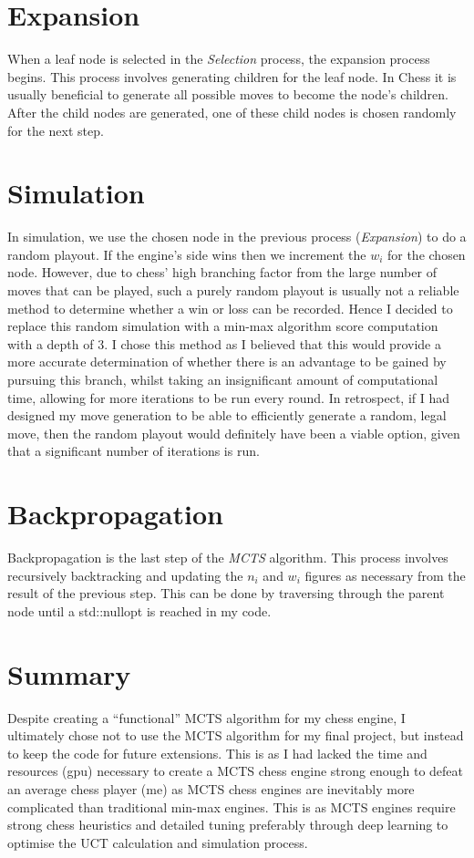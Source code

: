 \section{Expansion}
When a leaf node is selected in the \textit{Selection} process, the expansion process begins. This process involves generating children for the leaf node. In Chess it is usually beneficial to generate all possible moves to become the node's children. After the child nodes are generated, one of these child nodes is chosen randomly for the next step.
\section{Simulation}
In simulation, we use the chosen node in the previous process (\textit{Expansion}) to do a random playout. If the engine's side wins then we increment the $w_i$ for the chosen node. However, due to chess' high branching factor from the large number of moves that can be played, such a purely random playout is usually not a reliable method to determine whether a win or loss can be recorded. Hence I decided to replace this random simulation with a min-max algorithm score computation with a depth of 3. I chose this method as I believed that this would provide a more accurate determination of whether there is an advantage to be gained by pursuing this branch, whilst taking an insignificant amount of computational time, allowing for more iterations to be run every round. In retrospect, if I had designed my move generation to be able to efficiently generate a random, legal move, then the random playout would definitely have been a viable option, given that a significant number of iterations is run.
\section{Backpropagation}
Backpropagation is the last step of the \textit{MCTS} algorithm. This process involves recursively backtracking and updating the $n_i$ and $w_i$ figures as necessary from the result of the previous step. This can be done by traversing through the parent node until a std::nullopt is reached in my code.
\section{Summary}
Despite creating a ``functional'' MCTS algorithm for my chess engine, I ultimately chose not to use the MCTS algorithm for my final project, but instead to keep the code for future extensions. This is as I had lacked the time and resources (gpu) necessary to create a MCTS chess engine strong enough to defeat an average chess player (me) as MCTS chess engines are inevitably more complicated than traditional min-max engines. This is as MCTS engines require strong chess heuristics and detailed tuning preferably through deep learning to optimise the UCT calculation and simulation process.